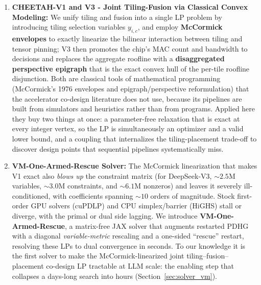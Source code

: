 \begin{enumerate}
    \item \textbf{CHEETAH-V1 and V3 - Joint Tiling-Fusion via Classical Convex Modeling:}
    We unify tiling and fusion into a single LP problem by introducing tiling selection variables $y_{i,c}$, and employ \textbf{McCormick envelopes} to exactly linearize the bilinear interaction between tiling and tensor pinning; V3 then promotes the chip's MAC count and bandwidth to decisions and replaces the aggregate roofline with a \textbf{disaggregated perspective epigraph} that is the exact convex hull of the per-tile roofline disjunction. Both are classical tools of mathematical programming (McCormick's 1976 envelopes and epigraph/perspective reformulation) that the accelerator co-design literature does not use, because its pipelines are built from simulators and heuristics rather than from programs. Applied here they buy two things at once: a parameter-free relaxation that is exact at every integer vertex, so the LP is simultaneously an optimizer and a valid lower bound, and a coupling that internalizes the tiling-placement trade-off to discover design points that sequential pipelines systematically miss.
    \item \textbf{VM-One-Armed-Rescue Solver:} The McCormick linearization that makes V1 exact also \emph{blows up} the constraint matrix (for DeepSeek-V3, ${\sim}2.5$M variables, ${\sim}3.0$M constraints, and ${\sim}6.1$M nonzeros) and leaves it severely ill-conditioned, with coefficients spanning ${\sim}10$ orders of magnitude. Stock first-order GPU solvers (cuPDLP) and CPU simplex/barrier (HiGHS) stall or diverge, with the primal or dual side lagging. We introduce \textbf{VM-One-Armed-Rescue}, a matrix-free JAX solver that augments restarted PDHG with a diagonal \emph{variable-metric} rescaling and a one-sided ``rescue'' restart, resolving these LPs to dual convergence in seconds. To our knowledge it is the first solver to make the McCormick-linearized joint tiling--fusion--placement co-design LP tractable at LLM scale: the enabling step that collapses a days-long search into hours (Section~\ref{sec:solver_vm}).


\end{enumerate}
